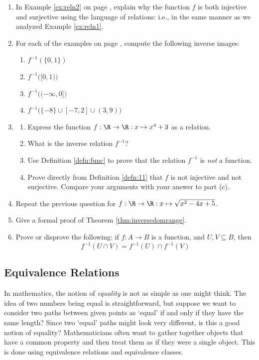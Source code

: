 \begin{enumerate}
  \item In Example \ref{ex:reln2} on page \pageref{ex:reln2}, explain why the function $f$ is both injective and surjective using the language of relations: i.e., in the same manner as we analyzed Example \ref{ex:reln1}.
  
  \item For each of the examples on page \pageref{ex:reln2}, compute the following inverse images:
  \begin{enumerate}
    \item $f^{-1}(\{0,1\})$
    \item $f^{-1}\Big([0,1)\Big)$
    \item $f^{-1}\Big((-\infty,0]\Big)$
    \item $f^{-1}\Big(\{-8\}\cup[-7,2]\cup (3,9)\Big)$
  \end{enumerate}
  
  \item\begin{enumerate}
    \item Express the function $f:\R\to\R:x\mapsto x^4+3$ as a relation.
    \item What is the inverse relation $f^{-1}$?
    \item Use Definition \ref{defn:func} to prove that the relation $f^{-1}$ is \emph{not} a function.
    \item Prove directly from Definition \ref{defn:11} that $f$ is not injective and not surjective. Compare your arguments with your answer to part (c).
  \end{enumerate}
  
  \item Repeat the previous question for $f:\R\to\R:x\mapsto \sqrt{x^2-4x+5}$.
  
  \item Give a formal proof of Theorem \ref{thm:inversedomrange}.
  
  \item Prove or disprove the following: if $f:A\to B$ is a function, and $U,V\subseteq B$, then
  \[f^{-1}(U\cap V)=f^{-1}(U)\cap f^{-1}(V)\]
\end{enumerate}
\newpage

\subsection{Equivalence Relations}\label{sec:equiv}

In mathematics, the notion of \emph{equality} is not as simple as one might think. The idea of two numbers being equal is straightforward, but suppose we want to consider two paths between given points as `equal' if and only if they have the same length? Since two `equal' paths might look very different, is this a good notion of equality? Mathematicians often want to gather together objects that have a common property and then treat them as if they were a single object. This is done using equivalence relations and equivalence classes.\\

